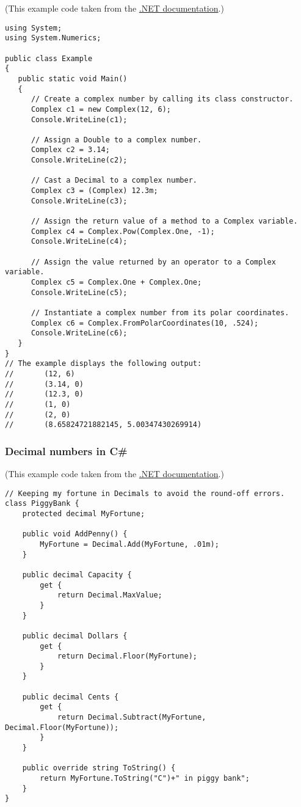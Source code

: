 \documentclass[11pt]{article}
\theoremstyle{definition}
\begin{document}
(This example code taken from the
\href{https://docs.microsoft.com/en-us/dotnet/api/system.numerics.complex?view=netcore-3.1}{.NET documentation}.)
\begin{verbatim}
using System;
using System.Numerics;

public class Example
{
   public static void Main()
   {
      // Create a complex number by calling its class constructor.
      Complex c1 = new Complex(12, 6);
      Console.WriteLine(c1);

      // Assign a Double to a complex number.
      Complex c2 = 3.14;
      Console.WriteLine(c2);

      // Cast a Decimal to a complex number.
      Complex c3 = (Complex) 12.3m;
      Console.WriteLine(c3);

      // Assign the return value of a method to a Complex variable.
      Complex c4 = Complex.Pow(Complex.One, -1);
      Console.WriteLine(c4);

      // Assign the value returned by an operator to a Complex variable.
      Complex c5 = Complex.One + Complex.One;
      Console.WriteLine(c5);

      // Instantiate a complex number from its polar coordinates.
      Complex c6 = Complex.FromPolarCoordinates(10, .524);
      Console.WriteLine(c6);
   }
}
// The example displays the following output:
//       (12, 6)
//       (3.14, 0)
//       (12.3, 0)
//       (1, 0)
//       (2, 0)
//       (8.65824721882145, 5.00347430269914)
\end{verbatim}

\subsubsection{Decimal numbers in C\#}
\label{sec:org7f8112f}

(This example code taken from the
\href{https://docs.microsoft.com/en-us/dotnet/api/system.decimal?view=netcore-3.1}{.NET documentation}.)
\begin{verbatim}
// Keeping my fortune in Decimals to avoid the round-off errors.
class PiggyBank {
    protected decimal MyFortune;

    public void AddPenny() {
        MyFortune = Decimal.Add(MyFortune, .01m);
    }

    public decimal Capacity {
        get {
            return Decimal.MaxValue;
        }
    }

    public decimal Dollars {
        get {
            return Decimal.Floor(MyFortune);
        }
    }

    public decimal Cents {
        get {
            return Decimal.Subtract(MyFortune, Decimal.Floor(MyFortune));
        }
    }

    public override string ToString() {
        return MyFortune.ToString("C")+" in piggy bank";
    }
}
\end{verbatim}
\end{document}

